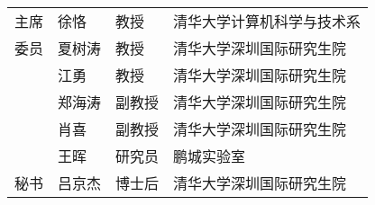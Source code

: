 \begin{committee}[name={学位论文公开评阅人和答辩委员会名单}]
    \begin{center}
    \begin{tabular}{C{2.75cm}C{2.98cm}C{4.63cm}C{4.63cm}@{}}
      主席 & 徐恪                  & 教授                    & 清华大学计算机科学与技术系       \\
      委员 & 夏树涛                  & 教授                    & 清华大学深圳国际研究生院       \\
          & 江勇                  & 教授                    & 清华大学深圳国际研究生院       \\
          & 郑海涛                  & 副教授                    & 清华大学深圳国际研究生院       \\
          & 肖喜                  & 副教授                    & 清华大学深圳国际研究生院       \\
          & 王晖                  & 研究员                    & 鹏城实验室       \\
      秘书 & 吕京杰                  & 博士后              & 清华大学深圳国际研究生院       \\
    \end{tabular}
  \end{center}

\end{committee}




